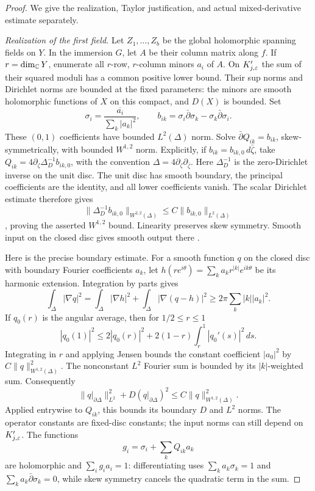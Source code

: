 \begin{proof}
We give the realization, Taylor justification, and actual mixed-derivative
estimate separately.

\emph{Realization of the first field.}
Let $Z_1,\ldots,Z_b$ be the global holomorphic spanning fields on $Y$.
In the immersion $G$, let $A$ be their column matrix along $f$.
If $r=\dim_\mathbb C Y$, enumerate all $r$-row, $r$-column minors $a_i$ of $A$.
On $K_{j,\varepsilon}'$ the sum of their squared moduli has a common positive
lower bound.
Their sup norms and Dirichlet norms are bounded at the fixed parameters:
the minors are smooth holomorphic functions of $X$ on this compact,
and $D(X)$ is bounded.  Set
\[
 \sigma_i=\frac{\overline{a_i}}{\sum_k|a_k|^2},\qquad
 b_{ik}=\sigma_i\bar\partial\sigma_k-
 \sigma_k\bar\partial\sigma_i.
\]
These $(0,1)$ coefficients have bounded $L^2(\Delta)$ norm.  Solve
$\bar\partial Q_{ik}=b_{ik}$, skew-symmetrically, with bounded
$W^{1,2}$ norm.  Explicitly, if $b_{ik}=b_{ik,0}\,d\bar\zeta$,
take $Q_{ik}=4\partial_\zeta\Delta_D^{-1}b_{ik,0}$, with the
convention $\Delta=4\partial_\zeta\partial_{\bar\zeta}$.
Here $\Delta_D^{-1}$ is the zero-Dirichlet inverse on the unit disc.
The unit disc has smooth boundary, the principal coefficients are
the identity, and all lower coefficients vanish.  The scalar
Dirichlet estimate therefore gives
\[
 \|\Delta_D^{-1}b_{ik,0}\|_{W^{2,2}(\Delta)}
 \le C\|b_{ik,0}\|_{L^2(\Delta)}
\]
\cite[Theorem~9.15 and Lemma~9.17]{GilbargTrudinger}, proving the
asserted $W^{1,2}$ bound.  Linearity preserves skew symmetry.
Smooth input on the closed disc gives smooth output there
\cite[Theorem~8.13]{GilbargTrudinger}.

Here is the precise boundary estimate.  For a smooth function $q$
on the closed disc with boundary Fourier coefficients $a_k$, let
$h(re^{i\theta})=\sum_k a_kr^{|k|}e^{ik\theta}$ be its harmonic
extension.  Integration by parts gives
\[
 \int_\Delta|\nabla q|^2
 =\int_\Delta|\nabla h|^2+\int_\Delta|\nabla(q-h)|^2
 \ge2\pi\sum_k|k||a_k|^2.
\]
If $q_0(r)$ is the angular average, then for $1/2\le r\le1$
\[
 |q_0(1)|^2\le2|q_0(r)|^2
          +2(1-r)\int_r^1|q_0'(s)|^2\,ds.
\]
Integrating in $r$ and applying Jensen bounds the constant
coefficient $|a_0|^2$ by $C\|q\|_{W^{1,2}(\Delta)}^2$.
The nonconstant $L^2$ Fourier sum is bounded by its $|k|$-weighted
sum.  Consequently
\[
 \|q|_{\partial\Delta}\|_{L^2}^2+D(q|_{\partial\Delta})^2
 \le C\|q\|_{W^{1,2}(\Delta)}^2.
\]
Applied entrywise to $Q_{ik}$, this bounds its boundary $D$ and
$L^2$ norms.  The operator constants are fixed-disc constants;
the input norms can still depend on $K'_{j,\varepsilon}$.
The functions
\[
 g_i=\sigma_i+\sum_kQ_{ik}a_k
\]
are holomorphic and $\sum_i g_i a_i=1$: differentiating uses
$\sum_k a_k\sigma_k=1$ and
$\sum_k a_k\bar\partial\sigma_k=0$, while skew symmetry cancels the
quadratic term in the sum.


\end{proof}
